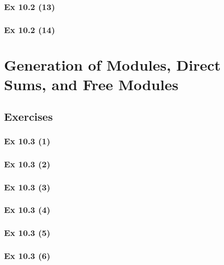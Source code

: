 \subsubsection{Ex 10.2 (13)}\label{sec:Ex_10.2.13}

\subsubsection{Ex 10.2 (14)}\label{sec:Ex_10.2.14}

\newpage		%

\section{Generation of Modules, Direct Sums, and Free Modules}\label{sec:10.3}	
\subsection*{Exercises}\label{sec:10.3_Exercises}

\subsubsection{Ex 10.3 (1)}\label{sec:Ex_10.3.1}

\subsubsection{Ex 10.3 (2)}\label{sec:Ex_10.3.2}

\subsubsection{Ex 10.3 (3)}\label{sec:Ex_10.3.3}

\subsubsection{Ex 10.3 (4)}\label{sec:Ex_10.3.4}

\subsubsection{Ex 10.3 (5)}\label{sec:Ex_10.3.5}

\subsubsection{Ex 10.3 (6)}\label{sec:Ex_10.3.6}

